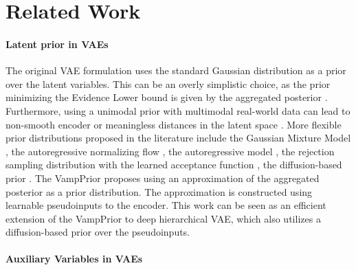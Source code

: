 \section{Related Work}
\paragraph{Latent prior in VAEs}
The original VAE formulation uses the standard Gaussian distribution as a prior over the latent variables.
This can be an overly simplistic choice, as the prior minimizing the Evidence Lower bound is given by the aggregated posterior \citep{hoffman2016elbo, tomczak2018vae}. 
Furthermore, using a unimodal prior with multimodal real-world data can lead to non-smooth encoder or meaningless distances in the latent space \citep{bozkurt2019rate}.
More flexible prior distributions proposed in the literature include the Gaussian Mixture Model \citep{jiang2016variational, nalisnick2016approximate, tran2022cauchy}, the autoregressive normalizing flow \citep{chen2016variational}, the autoregressive model \citep{gulrajani2016pixelvae, sadeghi2019pixelvae++}, the rejection sampling distribution with the learned acceptance function \citep{bauer2019resampled}, the diffusion-based prior \citep{vahdat2021score, wehenkel2021diffusion}. The VampPrior \citep{tomczak2018vae} proposes using an approximation of the aggregated posterior as a prior distribution. The approximation is constructed using learnable pseudoinputs to the encoder.
This work can be seen as an efficient extension of the VampPrior to deep hierarchical VAE, which also utilizes a diffusion-based prior over the pseudoinputs. 

\paragraph{Auxiliary Variables in VAEs}

